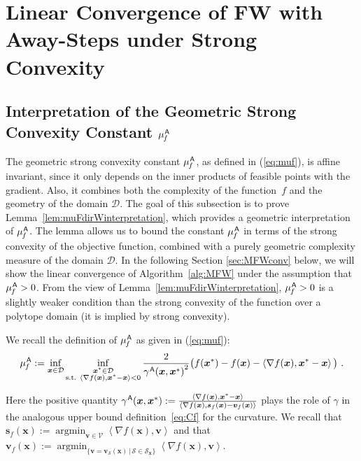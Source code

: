 \documentclass{article} %
\DeclareMathOperator*{\argmin}{\arg\min}
\newcommand{\domain}{\mathcal{D}}
\newcommand{\stepsize}{\gamma}
\newcommand{\away}{{\hspace{0.06em}\textsf{A}}}
\newcommand{\strongConvMFW}{\mu_{\hspace{-0.08em}f}^\away}
\newcommand{\x}{\bm{x}}
\newcommand{\s}{\bm{s}}
\newcommand{\vv}{\bm{v}} %
\newcommand{\Vertices}{\mathcal{V}}
\renewcommand{\S}{\mathcal{S}}
\newcommand{\innerProd}[2]{\left\langle #1 , #2 \right\rangle}
\newcommand{\0}{\mathbf{0}} %
\begin{document}
%
%
%


%
%
%
%
%
%
%
%

%



%
\section{Linear Convergence of FW with Away-Steps under Strong Convexity}
%
%
%
%
%
%
%
%
%
%
%
%
%
%
%
%
%
%
%
%
%
%
%
%
%
%
%
%
%
%
%
%
%
%


%
\subsection{Interpretation of the Geometric Strong Convexity Constant $\strongConvMFW$}
The geometric strong convexity constant $\strongConvMFW$, as defined in (\ref{eq:muf}), is affine invariant, since it only depends on the inner products of feasible points with the gradient. Also, it combines both the complexity of the function~$f$ and the geometry of the domain $\domain$.
The goal of this subsection is to prove Lemma~\ref{lem:muFdirWinterpretation}, which provides a geometric interpretation of $\strongConvMFW$. The lemma allows us to bound the constant $\strongConvMFW$ in terms of the strong convexity of the objective function, combined with a purely geometric complexity measure of the domain $\domain$. In the following Section \ref{sec:MFWconv} below, we will show the linear convergence of Algorithm~\ref{alg:MFW} under the assumption that $\strongConvMFW > 0$. From the view of Lemma~\ref{lem:muFdirWinterpretation}, $\strongConvMFW > 0$ is a slightly weaker condition than the strong convexity of the function over a polytope domain (it is implied by strong convexity).

We recall the definition of $\strongConvMFW$ as given in (\ref{eq:muf}):
\[
  \strongConvMFW := \inf_{\x\in \domain} \inf_{\substack{\x^* \in \domain\\
                        \textrm{s.t. } \left\langle \nabla f(\x), \x^*-\x \right\rangle < 0 }}
           \frac{2}{{\stepsize^\away(\x,\x^*)}^2}
           \big( f(\x^*)-f(\x)-\left\langle \nabla f(\x),  \x^*-\x \right\rangle \big) \ .
\]\vspace{-2mm}

Here the positive quantity $\stepsize^\away(\x,\x^*) := \frac{\innerProd{\nabla f(\x)}{\x^*-\x} }{\innerProd{\nabla f(\x)}{\s_f(\x) - \vv_f(\x)} }$ plays the role of $\stepsize$ in the analogous upper bound definition~\eqref{eq:Cf} for the curvature. We recall that $\s_f(\x) := \argmin_{\vv \in \Vertices} \left\langle \nabla f(\x), \vv \right\rangle$ and that $\vv_f(\x) := \displaystyle\argmin_{\{\vv = \vv_{\S}(\x) \,|\, \S \in \S_{\x} \}} \textstyle\left\langle \nabla f(\x), \vv \right\rangle$. 
\end{document}
